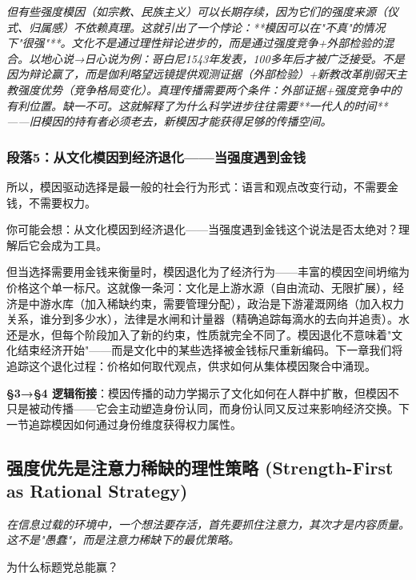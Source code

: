 \documentclass[a4paper,12pt]{book}
\newenvironment{motivation}{\begin{tcolorbox}[colback=gray!10,colframe=gray!60,title=\textit{本章动机 (Motivation)},fonttitle=\bfseries,arc=0mm,leftrule=3mm]\small\itshape}{\end{tcolorbox}}
\newenvironment{questionbox}{\begin{tcolorbox}[colback=red!3!white,colframe=red!60!black]}{\end{tcolorbox}}
\begin{document}
\begin{motivation}
\begin{motivation}
\begin{motivation}
但有些强度模因（如宗教、民族主义）可以长期存续，因为它们的强度来源（仪式、归属感）不依赖真理。这就引出了一个悖论：**模因可以在"不真"的情况下"很强"**。文化不是通过理性辩论进步的，而是通过强度竞争+外部检验的混合。以地心说→日心说为例：哥白尼1543年发表，100多年后才被广泛接受。不是因为辩论赢了，而是伽利略望远镜提供观测证据（外部检验）+新教改革削弱天主教强度优势（竞争格局变化）。真理传播需要两个条件：外部证据+强度竞争中的有利位置。缺一不可。这就解释了为什么科学进步往往需要**一代人的时间**——旧模因的持有者必须老去，新模因才能获得足够的传播空间。

	\subsubsection*{段落5：从文化模因到经济退化——当强度遇到金钱}
	所以，模因驱动选择是最一般的社会行为形式：语言和观点改变行动，不需要金钱，不需要权力。
	\begin{tcolorbox}[colback=yellow!5, title=\textit{读者行为预测}]
		你可能会想：从文化模因到经济退化——当强度遇到金钱这个说法是否太绝对？理解后它会成为工具。
	\end{tcolorbox}

但当选择需要用金钱来衡量时，模因退化为了经济行为——丰富的模因空间坍缩为价格这个单一标尺。这就像一条河：文化是上游水源（自由流动、无限扩展），经济是中游水库（加入稀缺约束，需要管理分配），政治是下游灌溉网络（加入权力关系，谁分到多少水），法律是水闸和计量器（精确追踪每滴水的去向并追责）。水还是水，但每个阶段加入了新的约束，性质就完全不同了。模因退化不意味着"文化结束经济开始"——而是文化中的某些选择被金钱标尺重新编码。下一章我们将追踪这个退化过程：价格如何取代观点，供求如何从集体模因聚合中涌现。

	\textbf{§3→§4 逻辑衔接}：模因传播的动力学揭示了文化如何在人群中扩散，但模因不只是被动传播——它会主动塑造身份认同，而身份认同又反过来影响经济交换。下一节追踪模因如何通过身份维度获得权力属性。


	
	\subsection{强度优先是注意力稀缺的理性策略 (Strength-First as Rational Strategy)}
	\begin{motivation}
		在信息过载的环境中，一个想法要存活，首先要抓住注意力，其次才是内容质量。这不是"愚蠢"，而是注意力稀缺下的最优策略。
	\end{motivation}
	\begin{questionbox}
		为什么标题党总能赢？
	\end{questionbox}


\end{motivation}
\end{motivation}
\end{motivation}
\end{document}
